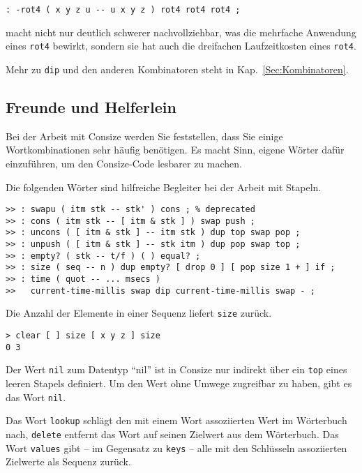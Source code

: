 \begin{verbatim}
: -rot4 ( x y z u -- u x y z ) rot4 rot4 rot4 ;
\end{verbatim}

macht nicht nur deutlich schwerer nachvollziehbar, was die mehrfache Anwendung eines \verb|rot4| bewirkt, sondern sie hat auch die dreifachen Laufzeitkosten eines \verb|rot4|.

Mehr zu \verb|dip| und den anderen Kombinatoren steht in Kap.~\ref{Sec:Kombinatoren}.

\subsection{Freunde und Helferlein}
\label{Sec:Friends}

Bei der Arbeit mit Consize werden Sie feststellen, dass Sie einige Wortkombinationen sehr häufig benötigen. Es macht Sinn, eigene Wörter dafür einzuführen, um den Consize-Code lesbarer zu machen.

Die folgenden Wörter sind hilfreiche Begleiter bei der Arbeit mit Stapeln. 

\begin{verbatim}
>> : swapu ( itm stk -- stk' ) cons ; % deprecated
>> : cons ( itm stk -- [ itm & stk ] ) swap push ;
>> : uncons ( [ itm & stk ] -- itm stk ) dup top swap pop ;
>> : unpush ( [ itm & stk ] -- stk itm ) dup pop swap top ;
>> : empty? ( stk -- t/f ) ( ) equal? ;
>> : size ( seq -- n ) dup empty? [ drop 0 ] [ pop size 1 + ] if ;
>> : time ( quot -- ... msecs )
>>   current-time-millis swap dip current-time-millis swap - ;
\end{verbatim}

Die Anzahl der Elemente in einer Sequenz liefert \verb|size| zurück.

\begin{verbatim}
> clear [ ] size [ x y z ] size
0 3
\end{verbatim}

Der Wert \verb|nil| zum Datentyp "`nil"' ist in Consize nur indirekt über ein \verb|top| eines leeren Stapels definiert. Um den Wert ohne Umwege zugreifbar zu haben, gibt es das Wort \verb|nil|.

Das Wort \verb|lookup| schlägt den mit einem Wort assoziierten Wert im Wörterbuch nach, \verb|delete| entfernt das Wort auf seinen Zielwert aus dem Wörterbuch. Das Wort \verb|values| gibt -- im Gegensatz zu \verb|keys| -- alle mit den Schlüsseln assoziierten Zielwerte als Sequenz zurück.
 

